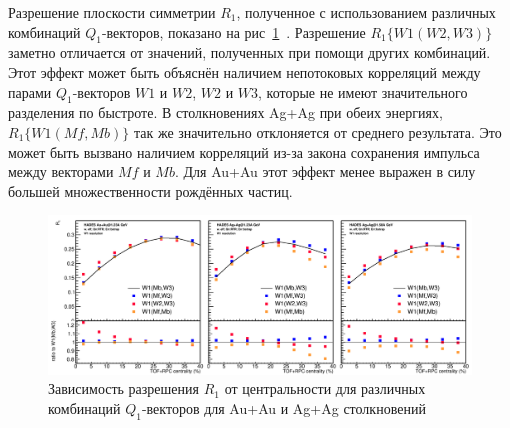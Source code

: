 Разрешение плоскости симметрии $R_1$, полученное с использованием различных комбинаций $Q_1$-векторов, показано на рис~\ref{fig:hades_w1_combinations}~\cite{Mamaev:2020qom}.
Разрешение $R_1\{W1(W2,W3)\}$ заметно отличается от значений, полученных при помощи других комбинаций. 
Этот эффект может быть объяснён наличием непотоковых корреляций между парами $Q_1$-векторов $W1$ и $W2$, $W2$ и $W3$, которые не имеют значительного разделения по быстроте. 
В столкновениях Ag+Ag при обеих энергиях, $R_1\{W1(Mf,Mb)\}$ так же значительно отклоняется от среднего результата. 
Это может быть вызвано наличием корреляций из-за закона сохранения импульса между векторами $Mf$ и $Mb$. 
Для Au+Au этот эффект менее выражен в силу большей множественности рождённых частиц.

\begin{figure}[h]
\begin{center}
\includegraphics[width=0.75\linewidth]{images/W1_combinations.png}
\caption{Зависимость  разрешения $R_1$ от центральности для различных комбинаций $Q_1$-векторов
  для Au+Au и  Ag+Ag столкновений}
\label{fig:hades_w1_combinations}
\end{center}
\end{figure}


